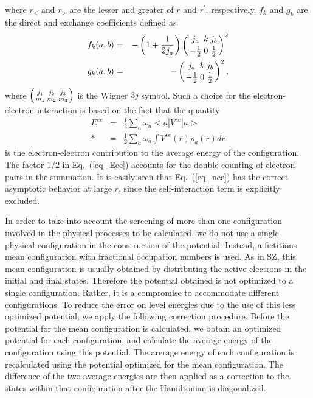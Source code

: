 \documentclass[preprint, floatfix, pra, showpacs, showkeys]{revtex4}
\newcommand{\threej}[6]{\ensuremath{\left({#1\atop #4}{#2\atop #5}
{#3\atop #6}\right)}}
\begin{document}
where $r_<$ and $r_>$ are the lesser and greater of $r$ and $r^\prime$,
respectively. $f_k$ and $g_k$ are the direct and exchange coefficients defined
as
\begin{eqnarray}
\label{eq_fg}
f_k(a,b) &=& -\left(1+\frac{1}{2j_a}\right)
\threej{j_a}{k}{j_b}{-\frac{1}{2}}{0}{\frac{1}{2}}^2 \nonumber\\*
g_k(a,b) &=& -\threej{j_a}{k}{j_b}{-\frac{1}{2}}{0}{\frac{1}{2}}^2,
\end{eqnarray}
where \threej{j_1}{j_2}{j_3}{m_1}{m_2}{m_3} is the Wigner $3j$ symbol. Such a
choice for the electron-electron interaction is based on the fact that the
quantity 
\begin{eqnarray}
\label{eq_Eee}
E^{ee} &=& \frac{1}{2}\sum_a\omega_a<a|V^{ee}|a> \nonumber\\*
&=& \frac{1}{2}\sum_a\omega_a\int V^{ee}(r)\rho_a(r)d r
\end{eqnarray}
is the electron-electron contribution to the average energy of the
configuration. The factor $1/2$ in Eq.~(\ref{eq_Eee}) accounts for the
double counting of electron pairs in the summation. It is easily seen
that Eq.~(\ref{eq_nee}) has the correct asymptotic behavior at large $r$,
since the self-interaction term is explicitly excluded.

In order to take into account the screening of more than one configuration
involved in the physical processes to be calculated, we do not use a single
physical configuration in the construction of the potential. Instead, a
fictitious mean configuration with fractional occupation numbers is used. As
in SZ, this mean configuration is usually obtained by distributing the active
electrons in the initial and final states. Therefore the potential obtained is
not optimized to a single configuration. Rather, it is a compromise to
accommodate different configurations. To reduce the error on level
energies due to the use of this less optimized potential, we apply the 
following correction procedure. Before the potential for the mean
configuration is calculated, we obtain an optimized potential for each
configuration, and calculate the average energy of the configuration using
this potential. The arerage energy of each configuration is recalculated using
the potential optimized for the mean configuration. The difference of the two
average energies are then applied as a correction to the states within that
configuration after the Hamiltonian is diagonalized.
\end{document}
